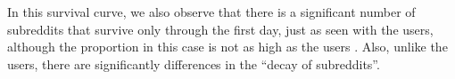 In this survival curve, we also observe that there is a significant number of subreddits that survive only through the first day, just as seen with the users, although the proportion in this case is not as high as the users . Also, unlike the users, there are significantly differences in the ``decay of subreddits''.
